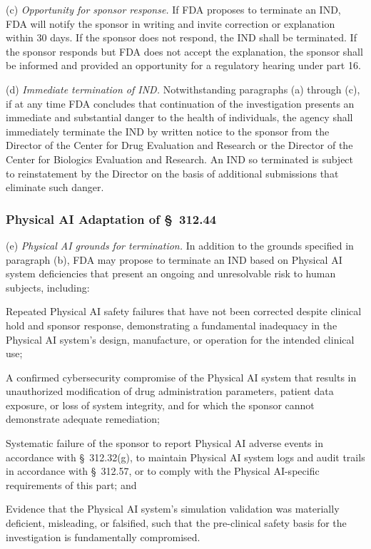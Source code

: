 (c) \textit{Opportunity for sponsor response.} If FDA proposes to terminate an IND, FDA will notify the sponsor in writing and invite correction or explanation within 30 days. If the sponsor does not respond, the IND shall be terminated. If the sponsor responds but FDA does not accept the explanation, the sponsor shall be informed and provided an opportunity for a regulatory hearing under part 16.

(d) \textit{Immediate termination of IND.} Notwithstanding paragraphs (a) through (c), if at any time FDA concludes that continuation of the investigation presents an immediate and substantial danger to the health of individuals, the agency shall immediately terminate the IND by written notice to the sponsor from the Director of the Center for Drug Evaluation and Research or the Director of the Center for Biologics Evaluation and Research. An IND so terminated is subject to reinstatement by the Director on the basis of additional submissions that eliminate such danger.

\subsubsection{Physical AI Adaptation of \S~312.44}

(e) \textit{Physical AI grounds for termination.} In addition to the grounds specified in paragraph (b), FDA may propose to terminate an IND based on Physical AI system deficiencies that present an ongoing and unresolvable risk to human subjects, including:

\begin{description}[leftmargin=0.8cm,style=sameline]
\item[(i)] Repeated Physical AI safety failures that have not been corrected despite clinical hold and sponsor response, demonstrating a fundamental inadequacy in the Physical AI system's design, manufacture, or operation for the intended clinical use;
\item[(ii)] A confirmed cybersecurity compromise of the Physical AI system that results in unauthorized modification of drug administration parameters, patient data exposure, or loss of system integrity, and for which the sponsor cannot demonstrate adequate remediation;
\item[(iii)] Systematic failure of the sponsor to report Physical AI adverse events in accordance with \S~312.32(g), to maintain Physical AI system logs and audit trails in accordance with \S~312.57, or to comply with the Physical AI-specific requirements of this part; and
\item[(iv)] Evidence that the Physical AI system's simulation validation was materially deficient, misleading, or falsified, such that the pre-clinical safety basis for the investigation is fundamentally compromised.
\end{description}

